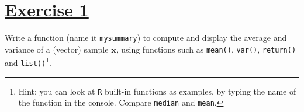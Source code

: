 \documentclass[a4paper,12pt]{article}\usepackage[]{graphicx}\usepackage[]{color}
\def\bx{\mathbf{x}}
\begin{document}
%


\begin{center}
\bigskip

\bigskip

\bigskip

\bigskip

\bigskip

\bigskip


\bigskip

\bigskip

\bigskip
\end{center}



\setlength{\parskip}{1ex plus 0.5ex minus 0.2ex}
\parindent=0cm
\setlength{\parskip}{1ex plus 0.5ex minus 0.2ex}
\linespread{1.1}
\sloppy

\section{\underline{Exercise 1}}

% 

Write a function (name it \verb"mysummary") to compute and display the average and variance of a (vector) sample $\bx$, using functions such as
\verb"mean()", \verb"var()", \verb"return()" and \verb"list()"\footnote{Hint: you can look at \texttt{R} built-in functions as examples, by typing the name of the function in the console. Compare \texttt{median} and \texttt{mean}.}.
\end{document}
